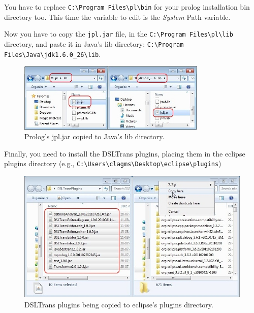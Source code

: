 You have to replace \verb=C:\Program Files\pl\bin= for your prolog installation
bin directory too. This time the variable to edit is the \emph{System} Path
variable.

Now you have to copy the \verb=jpl.jar= file, in the 
\verb=C:\Program Files\pl\lib= 
directory, and paste it in Java's lib directory: 
\verb=C:\Program Files\Java\jdk1.6.0_26\lib=.

\begin{figure}[h]
\begin{center}
  \includegraphics[width=0.8\textwidth]{imgs/jpl_cpy.jpg}
  \caption{Prolog's jpl.jar copied to Java's lib directory.}
  \label{fig:jpl_cpy}
\end{center}
\end{figure}

Finally, you need to install the DSLTrans plugins, placing them in the
eclipse plugins directory (e.g., \verb=C:\Users\clagms\Desktop\eclipse\plugins=)


\begin{figure}[h]
\begin{center}
  \includegraphics[width=\textwidth]{imgs/dsltrans_plugins_cpy.jpg}
  \caption{DSLTrans plugins being copied to eclipse's plugins directory.}
  \label{fig:dsltrans_plugins_cpy}
\end{center}
\end{figure}

\clearpage

